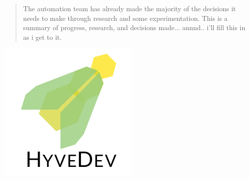


\maketitle

\begin{abstract}
The automation team has already made the majority of the decisions it needs to make through research and some experimentation.
This is a summary of progress, research, and decisions made...
annnd.. i'll fill this in as i get to it.
\end{abstract}

\begin{center}
	\includegraphics[width=.3\textwidth]{gfx/hyvedev-logo.pdf}
\end{center}


